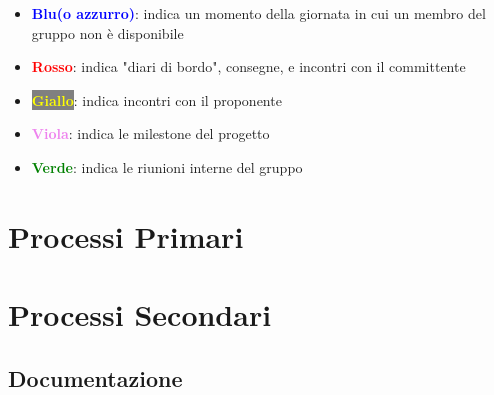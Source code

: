 \documentclass[a4paper,12pt]{article}
\begin{document}
\begin{itemize}
    \item \textbf{\textcolor{blue}{Blu(o azzurro)}}: indica un momento della giornata in cui un membro del gruppo non è disponibile
    \item \textbf{\textcolor{red}{Rosso}}: indica "diari di bordo", consegne, e incontri con il committente
    \item \colorbox{gray}{\textbf{\textcolor{yellow}{Giallo}}}: indica incontri con il proponente
    \item \textbf{\textcolor{violet}{Viola}}: indica le milestone del progetto
    \item \textbf{\textcolor{green}{Verde}}: indica le riunioni interne del gruppo
\end{itemize}


\newpage
\section{Processi Primari}


\newpage
\section{Processi Secondari}

\subsection{Documentazione}
\end{document}
